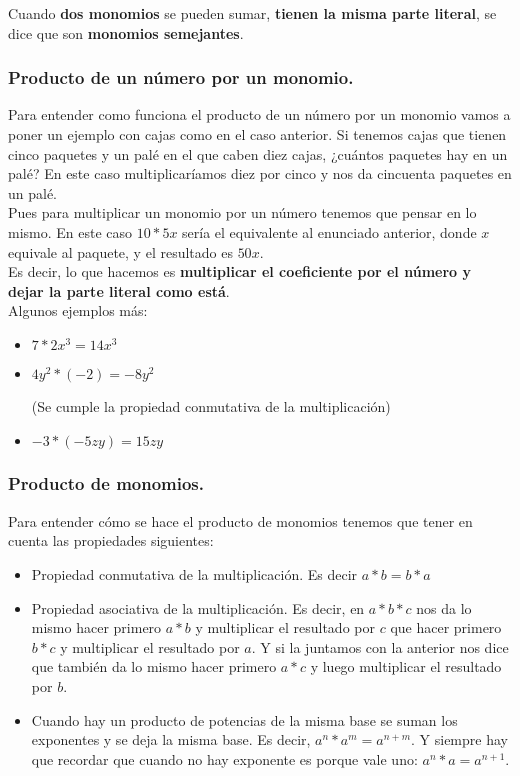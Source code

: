 \documentclass[a4paper,11pt,answers]{exam}
\begin{document}
  Cuando \textbf{dos monomios} se pueden sumar, \textbf{tienen la misma parte literal}, se dice que son \textbf{monomios semejantes}.
  \subsubsection{Producto de un número por un monomio.}
  Para entender como funciona el producto de un número por un monomio vamos a poner un ejemplo con cajas como en el caso anterior. Si tenemos cajas que tienen cinco paquetes y un palé en el que caben diez cajas, ¿cuántos paquetes hay en un palé? En este caso multiplicaríamos diez por cinco y nos da cincuenta paquetes en un palé.\\

  Pues para multiplicar un monomio por un número tenemos que pensar en lo mismo. En este caso $10*5x$ sería el equivalente al enunciado anterior, donde $x$ equivale al paquete, y el resultado es $50x$.\\
  Es decir, lo que hacemos es \textbf{multiplicar el coeficiente por el número y dejar la parte literal como está}.\\

  Algunos ejemplos más:
  \begin{solution}
    \begin{itemize}
    \item $7*2x^3 = 14x^3$
    \item $4y^2*(-2) = -8y^2$ \begin{small}
	(Se cumple la propiedad conmutativa de la multiplicación)
      \end{small}
    \item $-3*(-5zy) = 15zy$
    \end{itemize}
  \end{solution}

  \subsubsection{Producto de monomios.}
  Para entender cómo se hace el producto de monomios tenemos que tener en cuenta las propiedades siguientes:
  \begin{itemize}
  \item Propiedad conmutativa de la multiplicación. Es decir $a*b = b*a$
  \item Propiedad asociativa de la multiplicación. Es decir, en $a*b*c$ nos da lo mismo hacer primero $a*b$ y multiplicar el resultado por $c$ que hacer primero $b*c$ y multiplicar el resultado por $a$. Y si la juntamos con la anterior nos dice que también da lo mismo hacer primero $a*c$ y luego multiplicar el resultado por $b$.
  \item Cuando hay un producto de potencias de la misma base se suman los exponentes y se deja la misma base. Es decir, $a^n *a^m = a^{n+m}$. Y siempre hay que recordar que cuando no hay exponente es porque vale uno: $a^n *a = a^{n+1}$.
  \end{itemize}
\end{document}
